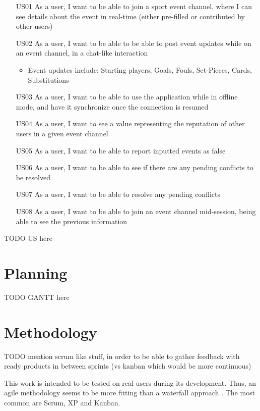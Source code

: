 \begin{itemize}[leftmargin  = 3.25\parindent, align=left]
    \item[US01] As a user, I want to be able to join a sport event channel, where I can see details about the event in real-time (either pre-filled or contributed by other users)
    \item[US02] As a user, I want to be able to be able to post event updates while on an event channel, in a chat-like interaction
    \begin{itemize}
        \item Event updates include: Starting players, Goals, Fouls, Set-Pieces, Cards, Substitutions
    \end{itemize} 
    \item[US03] As a user, I want to be able to use the application while in offline mode, and have it synchronize once the connection is resumed
    \item[US04] As a user, I want to see a value representing the reputation of other users in a given event channel
    \item[US05] As a user, I want to be able to report inputted events as false
    \item[US06] As a user, I want to be able to see if there are any pending conflicts to be resolved
    \item[US07] As a user, I want to be able to resolve any pending conflicts
    \item[US08] As a user, I want to be able to join an event channel mid-session, being able to see the previous information
\end{itemize}

TODO
US here

\section{Planning}\label{sec:prob-planning}

TODO
GANTT here

\section{Methodology}\label{sec:prob-methodology}

TODO
mention scrum like stuff, in order to be able to gather feedback with ready products in between sprints (vs kanban which would be more continuous)


This work is intended to be tested on real users during its development. Thus, an agile methodology seems to be more fitting than a waterfall approach \cite{beck2001agile}. The most common are Scrum, XP and Kanban.

